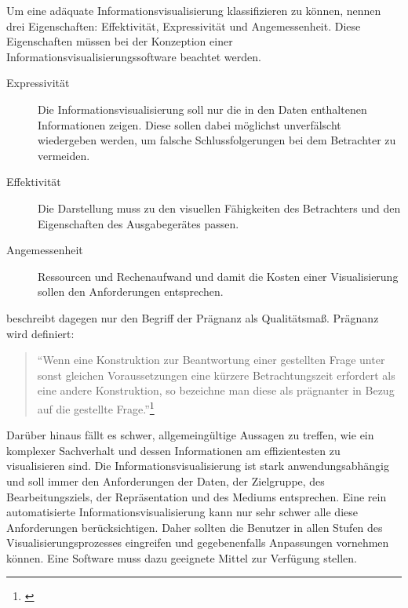 \documentclass[a4paper, 
               12pt,
               DIV=calc,
               version=first,
               pdftex,
               headsepline,
               footsepline,
               bibtotocnumbered,
               liststotocnumbered]{scrreprt}
\begin{document}
Um eine adäquate Informationsvisualisierung klassifizieren zu können, nennen \cite{Schumann} drei Eigenschaften:
Effektivität, Expressivität und Angemessenheit. Diese Eigenschaften müssen bei der Konzeption einer
Informationsvisualisierungssoftware beachtet werden.
\begin{description}
\item[Expressivität]
Die Informationsvisualisierung soll nur die in den Daten enthaltenen Informationen zeigen.
Diese sollen dabei möglichst unverfälscht wiedergeben werden, um falsche Schlussfolgerungen bei dem Betrachter zu vermeiden.
\item[Effektivität]
Die Darstellung muss zu den visuellen Fähigkeiten des Betrachters und den Eigenschaften des Ausgabegerätes
passen.
\item[Angemessenheit]
Ressourcen und Rechenaufwand und damit die Kosten einer Visualisierung sollen den Anforderungen entsprechen.
\end{description}
\cite{Bertin} beschreibt dagegen nur den Begriff der Prägnanz als Qualitätsmaß.
Prägnanz wird definiert:
\begin{quote}
"`Wenn eine Konstruktion zur Beantwortung einer gestellten Frage unter sonst gleichen Voraussetzungen eine
kürzere Betrachtungszeit erfordert als eine andere Konstruktion, so bezeichne man diese als prägnanter in
Bezug auf die gestellte Frage."'\footnote{\citep[S.\,17]{Bertin}}
\end{quote}
Darüber hinaus fällt es schwer, allgemeingültige Aussagen zu treffen, wie ein komplexer Sachverhalt und dessen
Informationen am effizientesten zu visualisieren sind. Die Informationsvisualisierung ist stark anwendungsabhängig und soll
immer den Anforderungen der Daten, der Zielgruppe, des Bearbeitungsziels, der Repräsentation und des Mediums entsprechen.
Eine rein automatisierte Informationsvisualisierung kann nur sehr schwer alle diese Anforderungen berücksichtigen. Daher
sollten die Benutzer in allen Stufen des Visualisierungsprozesses eingreifen und gegebenenfalls Anpassungen vornehmen können. Eine Software
muss dazu geeignete Mittel zur Verfügung stellen.
\end{document}
